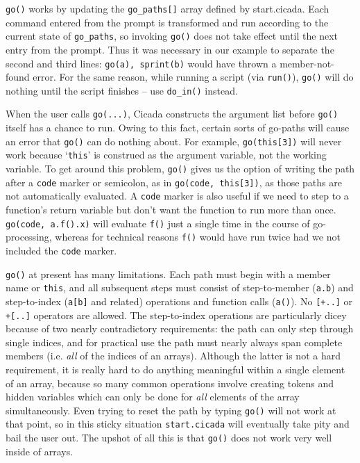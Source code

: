 \documentclass{article}
\begin{document}
\verb#go()# works by updating the \verb#go_paths[]# array defined by start.cicada.  Each command entered from the prompt is transformed and run according to the current state of \verb#go_paths#, so invoking \verb#go()# does not take effect until the next entry from the prompt.  Thus it was necessary in our example to separate the second and third lines:  \verb#go(a), sprint(b)# would have thrown a member-not-found error.  For the same reason, while running a script (via \verb#run()#), \verb#go()# will do nothing until the script finishes -- use \verb#do_in()# instead.

When the user calls \verb#go(...)#, Cicada constructs the argument list before \verb#go()# itself has a chance to run.  Owing to this fact, certain sorts of go-paths will cause an error that \verb#go()# can do nothing about.  For example, \verb#go(this[3])# will never work because `\verb#this#' is construed as the argument variable, not the working variable.  To get around this problem, \verb#go()# gives us the option of writing the path after a \verb#code# marker or semicolon, as in \verb#go(code, this[3])#, as those paths are not automatically evaluated.  A \verb#code# marker is also useful if we need to step to a function's return variable but don't want the function to run more than once.  \verb#go(code, a.f().x)# will evaluate \verb#f()# just a single time in the course of go-processing, whereas for technical reasons \verb#f()# would have run twice had we not included the \verb#code# marker.

\verb#go()# at present has many limitations.  Each path must begin with a member name or \verb#this#, and all subsequent steps must consist of step-to-member (\verb#a.b#) and step-to-index (\verb#a[b]# and related) operations and function calls (\verb#a()#).  No \verb#[+..]# or \verb#+[..]# operators are allowed.  The step-to-index operations are particularly dicey because of two nearly contradictory requirements:  the path can only step through single indices, and for practical use the path must nearly always span complete members (i.e. \emph{all} of the indices of an arrays).  Although the latter is not a hard requirement, it is really hard to do anything meaningful within a single element of an array, because so many common operations involve creating tokens and hidden variables which can only be done for \emph{all} elements of the array simultaneously.  Even trying to reset the path by typing \verb#go()# will not work at that point, so in this sticky situation \verb#start.cicada# will eventually take pity and bail the user out.  The upshot of all this is that \verb#go()# does not work very well inside of arrays.
\end{document}
